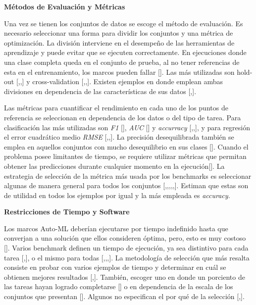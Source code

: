 \begin{flushleft} 
    {\large { \textbf{Métodos de Evaluación y Métricas}}}\label{subsection:met Auto-ML}
\end{flushleft}
Una vez se tienen los conjuntos de datos se escoge el método de evaluación. Es necesario seleccionar una forma para dividir los conjuntos y una métrica de optimización. 
La división interviene en el desempeño de las herramientas de aprendizaje y puede evitar que se ejecuten correctamente.
En ejecuciones donde una clase completa queda en el conjunto de prueba, al no tener referencias de esta en el entrenamiento, los marcos pueden fallar [\cite{10}]. 
Las más utilizadas son hold-out [\cite{11},\cite{26},\cite{32}] y cross-validation [\cite{10},\cite{15},\cite{22}]. Existen ejemplos en donde emplean ambas 
divisiones en dependencia de las características de sus datos [\cite{13},\cite{20}].

Las métricas para cuantificar el rendimiento en cada uno de los puntos de referencia se seleccionan en dependencia de los datos o del tipo de tarea. Para clasificación 
las más utilizadas son \textit{F1} [\cite{10}], \textit{AUC} [\cite{15}] y \textit{accurracy} [\cite{16},\cite{19},\cite{24}], y para regresión el error cuadrático medio 
\textit{RMSE} [\cite{10},\cite{16},\cite{19}]. La precisión desequilibrada también se emplea en aquellos conjuntos con mucho desequilibrio en sus clases [\cite{32}]. Cuando el 
problema posee limitantes de tiempo, se requiere utilizar métricas que permitan obtener las predicciones durante cualquier momento en la ejecución[\cite{29}]. La 
estrategia de selección de la métrica más usada por los benchmarks es seleccionar algunas de manera general 
para todos los conjuntos [\cite{8},\cite{9},\cite{13},\cite{20},\cite{26},\cite{22}]. Estiman que estas son de utilidad en todos los ejemplos por igual y 
la más empleada es \textit{accuracy}.

\begin{flushleft} 
    {\large { \textbf{Restricciones de Tiempo y Software}}}\label{subsection:tiempo Auto-ML}
\end{flushleft}

Los marcos Auto-ML deberían ejecutarse por tiempo indefinido hasta que converjan a una solución que ellos consideren óptima, pero, esto es muy costoso [\cite{16}]. 
Varios benchmark definen un tiempo de ejecución, ya sea distintivo para cada tarea [\cite{11},\cite{29}], o el mismo para todas [\cite{13},\cite{21},\cite{14},\cite{25}]. 
La metodología de selección que más resalta consiste en probar con varios ejemplos de tiempo y determinar en cuál se obtienen mejores resultados [\cite{15},\cite{31}]. 
También, escoger uno en donde un porciento de las tareas hayan logrado completarse [\cite{16}] o en dependencia de la escala de los conjuntos que presentan [\cite{23}]. 
Algunos no especifican el por qué de la selección [\cite{14},\cite{22}]. 

